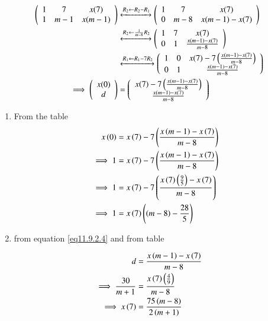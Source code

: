 \documentclass[journal,12pt,onecolumn]{IEEEtran}
\theoremstyle{remark}
\begin{document}
\begin{align}
\left(
\begin{array}{ccc}
1 & 7 & x(7) \\
1 & m-1 & x(m-1)
\end{array}
\right)
&\xleftrightarrow[]{R_2 \leftarrow R_2-R_1}
\left(
\begin{array}{ccc}
1 & 7 & x(7) \\
0 & m-8 & x(m-1)-x(7)
\end{array}
\right)
\\
&\xleftrightarrow[]{R_2 \leftarrow \frac{1}{m-8}R_2}
\left(
\begin{array}{ccc}
1 & 7 & x(7) \\
0 & 1 & \frac{x(m-1)-x(7)}{m-8}
\end{array}
\right)
\\
&\xleftrightarrow[]{R_1 \leftarrow R_1-7R_2}
\left(
\begin{array}{ccc}
1 & 0 & x(7)-7\left(\frac{x(m-1)-x(7)}{m-8}\right) \\
0 & 1 & \frac{x(m-1)-x(7)}{m-8}
\end{array}
\right)
\\
\implies \left(
\begin{array}{c}
x(0) \\
d
\end{array}
\right)
&=
\left(
\begin{array}{c}
x(7)-7\left(\frac{x(m-1)-x(7)}{m-8}\right) \\
\frac{x(m-1)-x(7)}{m-8}
\end{array}
\right)
\end{align}
\begin{enumerate}
    \item From the table\\
\begin{align}
    x\left(0\right)&=x\left(7\right)-7\left(\frac{x\left(m-1\right)-x\left(7\right)}{m-8}\right)\\
    \implies1&=x\left(7\right)-7\left(\frac{x\left(m-1\right)-x\left(7\right)}{m-8}\right)\\
    \implies1&=x\left(7\right)-7\left(\frac{x\left(7\right)\left(\frac{9}{5}\right)-x\left(7\right)}{m-8}\right)\\
    \implies1&=x\left(7\right)\left(\left(m-8\right)-\frac{28}{5}\right) \label{eq11.9.2.14}
\end{align}
\item from equation \eqref{eq11.9.2.4} and from table\\
\end{enumerate}
 \begin{align}
    d&=\frac{x\left(m-1\right)-x\left(7\right)}{m-8}\\
    \implies\frac{30}{m+1}&=\frac{x\left(7\right)\left(\frac{4}{9}\right)}{m-8}\\ \label{eq11.9.2.17}
    \implies x\left(7\right)&=\frac{75\left(m-8\right)}{2\left(m+1\right)}
 \end{align}
\end{document}

